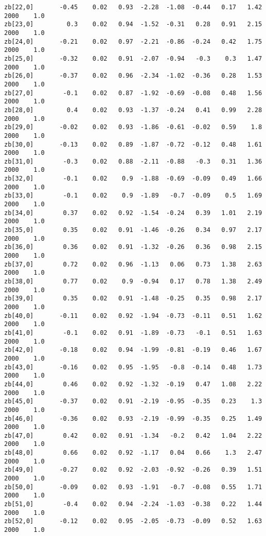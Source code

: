 \documentclass[11pt]{article}
\begin{document}
\begin{Verbatim}[commandchars=\\\{\}]
zb[22,0]       -0.45    0.02   0.93  -2.28  -1.08  -0.44   0.17   1.42   2000    1.0
zb[23,0]         0.3    0.02   0.94  -1.52  -0.31   0.28   0.91   2.15   2000    1.0
zb[24,0]       -0.21    0.02   0.97  -2.21  -0.86  -0.24   0.42   1.75   2000    1.0
zb[25,0]       -0.32    0.02   0.91  -2.07  -0.94   -0.3    0.3   1.47   2000    1.0
zb[26,0]       -0.37    0.02   0.96  -2.34  -1.02  -0.36   0.28   1.53   2000    1.0
zb[27,0]        -0.1    0.02   0.87  -1.92  -0.69  -0.08   0.48   1.56   2000    1.0
zb[28,0]         0.4    0.02   0.93  -1.37  -0.24   0.41   0.99   2.28   2000    1.0
zb[29,0]       -0.02    0.02   0.93  -1.86  -0.61  -0.02   0.59    1.8   2000    1.0
zb[30,0]       -0.13    0.02   0.89  -1.87  -0.72  -0.12   0.48   1.61   2000    1.0
zb[31,0]        -0.3    0.02   0.88  -2.11  -0.88   -0.3   0.31   1.36   2000    1.0
zb[32,0]        -0.1    0.02    0.9  -1.88  -0.69  -0.09   0.49   1.66   2000    1.0
zb[33,0]        -0.1    0.02    0.9  -1.89   -0.7  -0.09    0.5   1.69   2000    1.0
zb[34,0]        0.37    0.02   0.92  -1.54  -0.24   0.39   1.01   2.19   2000    1.0
zb[35,0]        0.35    0.02   0.91  -1.46  -0.26   0.34   0.97   2.17   2000    1.0
zb[36,0]        0.36    0.02   0.91  -1.32  -0.26   0.36   0.98   2.15   2000    1.0
zb[37,0]        0.72    0.02   0.96  -1.13   0.06   0.73   1.38   2.63   2000    1.0
zb[38,0]        0.77    0.02    0.9  -0.94   0.17   0.78   1.38   2.49   2000    1.0
zb[39,0]        0.35    0.02   0.91  -1.48  -0.25   0.35   0.98   2.17   2000    1.0
zb[40,0]       -0.11    0.02   0.92  -1.94  -0.73  -0.11   0.51   1.62   2000    1.0
zb[41,0]        -0.1    0.02   0.91  -1.89  -0.73   -0.1   0.51   1.63   2000    1.0
zb[42,0]       -0.18    0.02   0.94  -1.99  -0.81  -0.19   0.46   1.67   2000    1.0
zb[43,0]       -0.16    0.02   0.95  -1.95   -0.8  -0.14   0.48   1.73   2000    1.0
zb[44,0]        0.46    0.02   0.92  -1.32  -0.19   0.47   1.08   2.22   2000    1.0
zb[45,0]       -0.37    0.02   0.91  -2.19  -0.95  -0.35   0.23    1.3   2000    1.0
zb[46,0]       -0.36    0.02   0.93  -2.19  -0.99  -0.35   0.25   1.49   2000    1.0
zb[47,0]        0.42    0.02   0.91  -1.34   -0.2   0.42   1.04   2.22   2000    1.0
zb[48,0]        0.66    0.02   0.92  -1.17   0.04   0.66    1.3   2.47   2000    1.0
zb[49,0]       -0.27    0.02   0.92  -2.03  -0.92  -0.26   0.39   1.51   2000    1.0
zb[50,0]       -0.09    0.02   0.93  -1.91   -0.7  -0.08   0.55   1.71   2000    1.0
zb[51,0]        -0.4    0.02   0.94  -2.24  -1.03  -0.38   0.22   1.44   2000    1.0
zb[52,0]       -0.12    0.02   0.95  -2.05  -0.73  -0.09   0.52   1.63   2000    1.0

\end{Verbatim}
\end{document}
